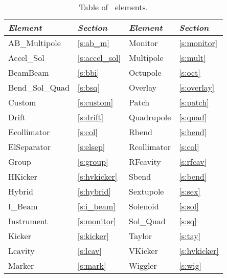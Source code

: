 \begin{table}[h]
\centering
{\tt
\begin{tabular}{|l|l||l|l|} \hline
  {\it Element}   & {\it Section}     & {\it Element} & {\it Section}    \\ \hline
  AB\_Multipole   & \ref{s:ab_m}      &  Monitor      & \ref{s:monitor}  \\ \hline
  Accel\_Sol      & \ref{s:accel_sol} &  Multipole    & \ref{s:mult}     \\ \hline
  BeamBeam        & \ref{s:bbi}       &  Octupole     & \ref{s:oct}      \\ \hline
  Bend\_Sol\_Quad & \ref{s:bsq}       &  Overlay      & \ref{s:overlay}  \\ \hline
  Custom          & \ref{s:custom}    &  Patch        & \ref{s:patch}    \\ \hline
  Drift           & \ref{s:drift}     &  Quadrupole   & \ref{s:quad}     \\ \hline
  Ecollimator     & \ref{s:col}       &  Rbend        & \ref{s:bend}     \\ \hline
  ElSeparator     & \ref{s:elsep}     &  Rcollimator  & \ref{s:col}      \\ \hline
  Group           & \ref{s:group}     &  RFcavity     & \ref{s:rfcav}    \\ \hline
  HKicker         & \ref{s:hvkicker}  &  Sbend        & \ref{s:bend}     \\ \hline
  Hybrid          & \ref{s:hybrid}    &  Sextupole    & \ref{s:sex}      \\ \hline
  I\_Beam         & \ref{s:i_beam}    &  Solenoid     & \ref{s:sol}      \\ \hline
  Instrument      & \ref{s:monitor}   &  Sol\_Quad    & \ref{s:sq}       \\ \hline
  Kicker          & \ref{s:kicker}    &  Taylor       & \ref{s:tay}      \\ \hline
  Lcavity         & \ref{s:lcav}      &  VKicker      & \ref{s:hvkicker} \\ \hline
  Marker          & \ref{s:mark}      &  Wiggler      & \ref{s:wig}      \\ \hline
  
\end{tabular}
}
\caption{Table of \bmad\ elements.}
\label{t:elements}\center
\end{table}

\vfil
\break

